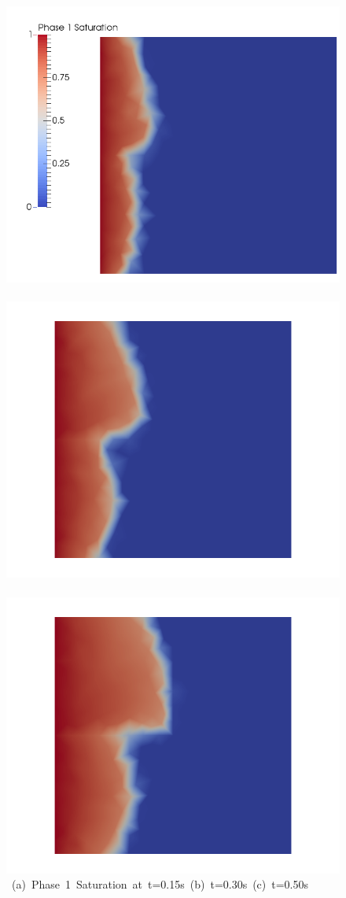 \begin{landscape}
\begin{figure}[ht] 
\vbox{\vspace{-1cm}
\hbox{\includegraphics[width=.56\textwidth]{./Pics/HarmMeanCase/HarmMeanCase_Saturation_t_dot15.png}
      \includegraphics[width=.56\textwidth]{./Pics/HarmMeanCase/HarmMeanCase_Saturation_t_dot30.png}
      \includegraphics[width=.56\textwidth]{./Pics/HarmMeanCase/HarmMeanCase_Saturation_t_dot50.png}}
\vspace{0.cm}
\hbox{\hspace{0.5cm} (a) Phase 1 Saturation at t=0.15s \hspace{3.75cm} (b) t=0.30s \hspace{5.0cm} (c) t=0.50s}
}
\end{figure}
\end{landscape}
